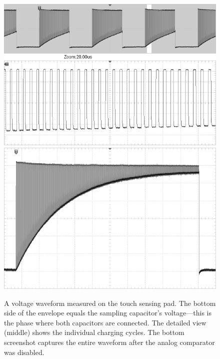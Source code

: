\begin{figure}
	\centering
	\includegraphics[width=.9\textwidth] {img/tsc-wfm-bw.png} \\
	\vspace{5mm}
	\includegraphics[width=.9\textwidth] {img/tsc-wfm2-bw.png}
	\caption{\label{fig:tsc-wfm}A voltage waveform measured on the touch sensing pad. The bottom side of the envelope equals the sampling capacitor's voltage---this is the phase where both capacitors are connected. The detailed view (middle) shows the individual charging cycles. The bottom screenshot captures the entire waveform after the analog comparator was disabled.}
\end{figure}


